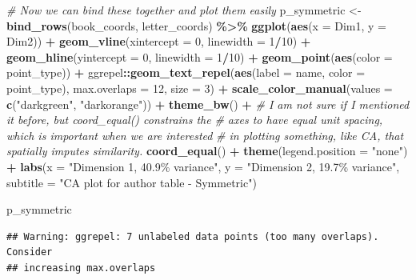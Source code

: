 \documentclass[
]{book}
\newenvironment{Shaded}{\begin{snugshade}}{\end{snugshade}}
\newcommand{\AttributeTok}[1]{\textcolor[rgb]{0.13,0.29,0.53}{#1}}
\newcommand{\CommentTok}[1]{\textcolor[rgb]{0.56,0.35,0.01}{\textit{#1}}}
\newcommand{\DecValTok}[1]{\textcolor[rgb]{0.00,0.00,0.81}{#1}}
\newcommand{\FunctionTok}[1]{\textcolor[rgb]{0.13,0.29,0.53}{\textbf{#1}}}
\newcommand{\NormalTok}[1]{#1}
\newcommand{\OtherTok}[1]{\textcolor[rgb]{0.56,0.35,0.01}{#1}}
\newcommand{\SpecialCharTok}[1]{\textcolor[rgb]{0.81,0.36,0.00}{\textbf{#1}}}
\newcommand{\StringTok}[1]{\textcolor[rgb]{0.31,0.60,0.02}{#1}}
\begin{document}
\begin{Shaded}
\begin{Highlighting}[]
\CommentTok{\# Now we can bind these together and plot them easily}
\NormalTok{p\_symmetric }\OtherTok{\textless{}{-}} 
  \FunctionTok{bind\_rows}\NormalTok{(book\_coords, letter\_coords) }\SpecialCharTok{\%\textgreater{}\%}
  \FunctionTok{ggplot}\NormalTok{(}\FunctionTok{aes}\NormalTok{(}\AttributeTok{x =}\NormalTok{ Dim1, }\AttributeTok{y =}\NormalTok{ Dim2)) }\SpecialCharTok{+} 
  \FunctionTok{geom\_vline}\NormalTok{(}\AttributeTok{xintercept =} \DecValTok{0}\NormalTok{, }\AttributeTok{linewidth =} \DecValTok{1}\SpecialCharTok{/}\DecValTok{10}\NormalTok{) }\SpecialCharTok{+} 
  \FunctionTok{geom\_hline}\NormalTok{(}\AttributeTok{yintercept =} \DecValTok{0}\NormalTok{, }\AttributeTok{linewidth =} \DecValTok{1}\SpecialCharTok{/}\DecValTok{10}\NormalTok{) }\SpecialCharTok{+}
  \FunctionTok{geom\_point}\NormalTok{(}\FunctionTok{aes}\NormalTok{(}\AttributeTok{color =}\NormalTok{ point\_type)) }\SpecialCharTok{+} 
\NormalTok{  ggrepel}\SpecialCharTok{::}\FunctionTok{geom\_text\_repel}\NormalTok{(}\FunctionTok{aes}\NormalTok{(}\AttributeTok{label =}\NormalTok{ name, }\AttributeTok{color =}\NormalTok{ point\_type),}
                           \AttributeTok{max.overlaps =} \DecValTok{12}\NormalTok{, }\AttributeTok{size =} \DecValTok{3}\NormalTok{) }\SpecialCharTok{+}
  \FunctionTok{scale\_color\_manual}\NormalTok{(}\AttributeTok{values =} \FunctionTok{c}\NormalTok{(}\StringTok{"darkgreen"}\NormalTok{, }\StringTok{"darkorange"}\NormalTok{)) }\SpecialCharTok{+}
  \FunctionTok{theme\_bw}\NormalTok{() }\SpecialCharTok{+} 
  \CommentTok{\# I am not sure if I mentioned it before, but \textasciigrave{}coord\_equal()\textasciigrave{} constrains the}
  \CommentTok{\# axes to have equal unit spacing, which is important when we are interested}
  \CommentTok{\# in plotting something, like CA, that spatially imputes similarity.}
  \FunctionTok{coord\_equal}\NormalTok{() }\SpecialCharTok{+}
  \FunctionTok{theme}\NormalTok{(}\AttributeTok{legend.position =} \StringTok{"none"}\NormalTok{) }\SpecialCharTok{+}
  \FunctionTok{labs}\NormalTok{(}\AttributeTok{x =} \StringTok{"Dimension 1, 40.9\% variance"}\NormalTok{,}
       \AttributeTok{y =} \StringTok{"Dimension 2, 19.7\% variance"}\NormalTok{,}
       \AttributeTok{subtitle =} \StringTok{"CA plot for \textasciigrave{}author\textasciigrave{} table {-} Symmetric"}\NormalTok{)}

\NormalTok{p\_symmetric}
\end{Highlighting}
\end{Shaded}

\begin{verbatim}
## Warning: ggrepel: 7 unlabeled data points (too many overlaps). Consider
## increasing max.overlaps
\end{verbatim}
\end{document}
